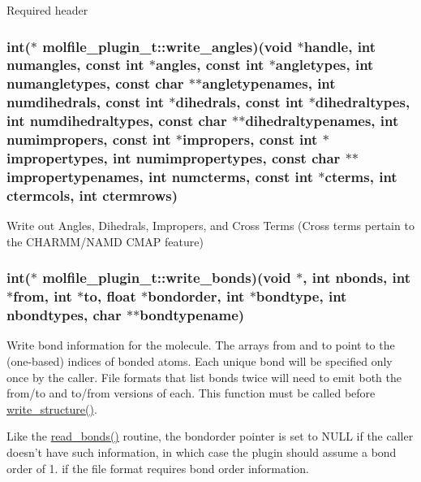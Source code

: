 \-Required header \hypertarget{structmolfile__plugin__t_a39e12d9cbf00ffa9e5da4845825d3846}{
\subsubsection[{write\-\_\-angles}]{\setlength{\rightskip}{0pt plus 5cm}int($\ast$  {\bf molfile\-\_\-plugin\-\_\-t\-::write\-\_\-angles})({\bf void} $\ast$handle, int numangles, const int $\ast${\bf angles}, const int $\ast$angletypes, int numangletypes, const char $\ast$$\ast$angletypenames, int numdihedrals, const int $\ast$dihedrals, const int $\ast$dihedraltypes, int numdihedraltypes, const char $\ast$$\ast$dihedraltypenames, int numimpropers, const int $\ast$impropers, const int $\ast$impropertypes, int numimpropertypes, const char $\ast$$\ast$impropertypenames, int numcterms, const int $\ast$cterms, int ctermcols, int ctermrows)}}\label{structmolfile__plugin__t_a39e12d9cbf00ffa9e5da4845825d3846}
\-Write out \-Angles, \-Dihedrals, \-Impropers, and \-Cross \-Terms (\-Cross terms pertain to the \-C\-H\-A\-R\-M\-M/\-N\-A\-M\-D \-C\-M\-A\-P feature) \hypertarget{structmolfile__plugin__t_a0af11d8d87bbc73eb219a02039204c65}{
\subsubsection[{write\-\_\-bonds}]{\setlength{\rightskip}{0pt plus 5cm}int($\ast$  {\bf molfile\-\_\-plugin\-\_\-t\-::write\-\_\-bonds})({\bf void} $\ast$, int nbonds, int $\ast$from, int $\ast$to, float $\ast$bondorder, int $\ast$bondtype, int nbondtypes, char $\ast$$\ast$bondtypename)}}\label{structmolfile__plugin__t_a0af11d8d87bbc73eb219a02039204c65}
\-Write bond information for the molecule. \-The arrays from and to point to the (one-\/based) indices of bonded atoms. \-Each unique bond will be specified only once by the caller. \-File formats that list bonds twice will need to emit both the from/to and to/from versions of each. \-This function must be called before \hyperlink{structmolfile__plugin__t_a96caabc2f33c5a710e82cfe20316568f}{write\-\_\-structure()}.

\-Like the \hyperlink{structmolfile__plugin__t_a6e1aca38d75aacb2cbcf6401261cdb5f}{read\-\_\-bonds()} routine, the bondorder pointer is set to \-N\-U\-L\-L if the caller doesn't have such information, in which case the plugin should assume a bond order of 1. if the file format requires bond order information.

